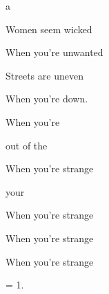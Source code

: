 

\zs
{}

 

 

 a

\bigskip

Women seem wicked

When you're unwanted

Streets are uneven

When you're down.
\ks

\zr
When you're 

 out of the 

When you're strange

 your 

When you're strange

When you're strange

When you're strange
\kr

\zs
= 1.
\ks

\zr\kr

\kp
